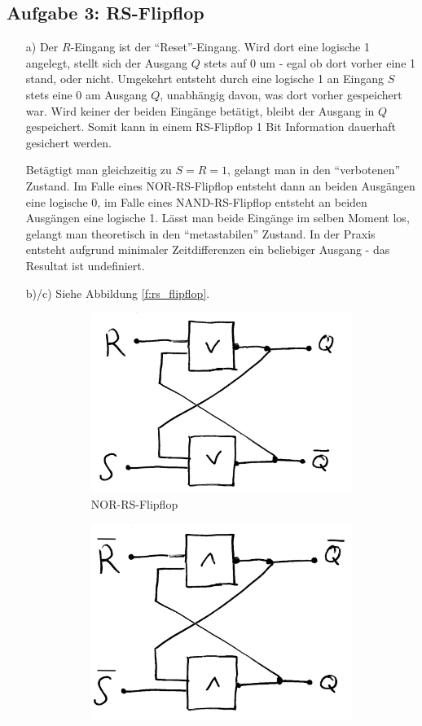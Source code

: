 \documentclass{article}
\begin{document}
	\subsection*{Aufgabe 3: RS-Flipflop}
	\begin{enumerate}
		\item[a)] Der $R$-Eingang ist der "`Reset"'-Eingang. Wird dort eine logische 1 angelegt, stellt sich der Ausgang $Q$ stets auf 0 um - egal ob dort vorher eine 1 stand, oder nicht. Umgekehrt entsteht durch eine logische 1 an Eingang $S$ stets eine 0 am Ausgang $Q$, unabhängig davon, was dort vorher gespeichert war. Wird keiner der beiden Eingänge betätigt, bleibt der Ausgang in $Q$ gespeichert. Somit kann in einem RS-Flipflop 1 Bit Information dauerhaft gesichert werden. 
		
		Betägtigt man gleichzeitig zu $S = R = 1$, gelangt man in den "`verbotenen"' Zustand. Im Falle eines NOR-RS-Flipflop entsteht dann an beiden Ausgängen eine logische 0, im Falle eines NAND-RS-Flipflop entsteht an beiden Ausgängen eine logische 1. Lässt man beide Eingänge im selben Moment los, gelangt man theoretisch in den "`metastabilen"' Zustand. In der Praxis entsteht aufgrund minimaler Zeitdifferenzen ein beliebiger Ausgang - das Resultat ist undefiniert. 
		\item[b)/c)] Siehe Abbildung \ref{f:rs_flipflop}.
		\begin{figure}[h]
			\begin{subfigure}[b]{0.5\linewidth}
				\centering
				\includegraphics[width=.8\linewidth]{nor_rs.jpeg}
				\caption{NOR-RS-Flipflop}
				\label{f:nor_rs}
			\end{subfigure}
			\begin{subfigure}[b]{0.5\linewidth}
				\centering
				\includegraphics[width=.8\linewidth]{nand_rs.jpeg}

\end{subfigure}
\end{figure}
\end{enumerate}
\end{document}
